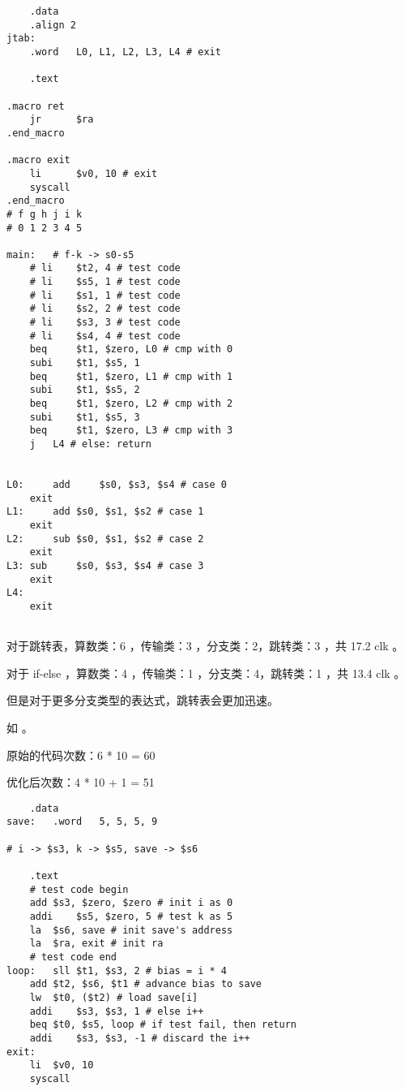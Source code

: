\documentclass[lang=cn,11pt,a4paper,cite=authoryear]{elegantpaper}
\begin{document}
\begin{lstlisting}
	.data
	.align 2
jtab:
	.word	L0, L1, L2, L3, L4 # exit

	.text 

.macro ret
	jr   	$ra
.end_macro 

.macro exit
	li      $v0, 10	# exit
	syscall
.end_macro
# f g h j i k
# 0 1 2 3 4 5

main:	# f-k -> s0-s5
	# li	$t2, 4 # test code 
	# li	$s5, 1 # test code 
	# li	$s1, 1 # test code 
	# li	$s2, 2 # test code 
	# li	$s3, 3 # test code 
	# li	$s4, 4 # test code 
	beq 	$t1, $zero, L0 # cmp with 0
	subi	$t1, $s5, 1
 	beq 	$t1, $zero, L1 # cmp with 1
	subi	$t1, $s5, 2
	beq 	$t1, $zero, L2 # cmp with 2
	subi	$t1, $s5, 3
	beq 	$t1, $zero, L3 # cmp with 3
	j 	L4 # else: return

	
L0: 	add 	$s0, $s3, $s4 # case 0
	exit 
L1: 	add	$s0, $s1, $s2 # case 1
	exit
L2: 	sub	$s0, $s1, $s2 # case 2
	exit
L3:	sub 	$s0, $s3, $s4 # case 3
	exit
L4: 				
	exit
	
\end{lstlisting}    


对于跳转表，算数类：6 ，传输类：3 ，分支类：2，跳转类：3 ，共 17.2 clk 。

对于 if-else ，算数类：4 ，传输类：1 ，分支类：4，跳转类：1 ，共 13.4 clk 。

但是对于更多分支类型的表达式，跳转表会更加迅速。


如 。




原始的代码次数：6 * 10 = 60

优化后次数：4 * 10 + 1 = 51

\begin{lstlisting}
 	.data
save:	.word 	5, 5, 5, 9

# i -> $s3, k -> $s5, save -> $s6

	.text
	# test code begin
	add	$s3, $zero, $zero # init i as 0
	addi	$s5, $zero, 5 # test k as 5
	la	$s6, save # init save's address 
	la 	$ra, exit # init ra
	# test code end
loop:	sll	$t1, $s3, 2 # bias = i * 4
	add	$t2, $s6, $t1 # advance bias to save 
	lw	$t0, ($t2) # load save[i]
	addi	$s3, $s3, 1 # else i++
	beq	$t0, $s5, loop # if test fail, then return
	addi 	$s3, $s3, -1 # discard the i++
exit:	
	li	$v0, 10
	syscall
	
\end{lstlisting}    
\end{document}
